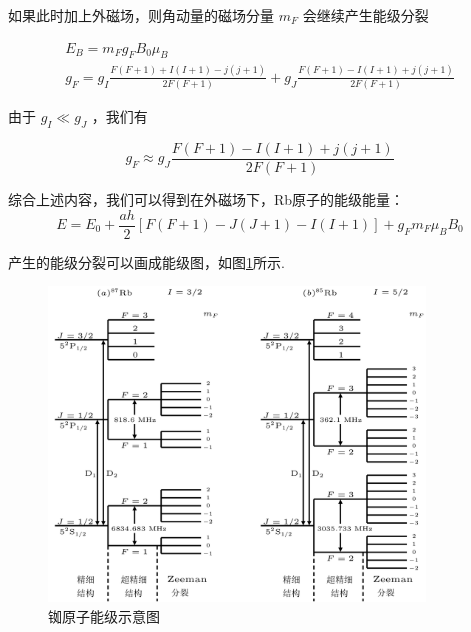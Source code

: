 \documentclass[10pt,hyperref,a4paper,UTF8]{ctexart}
\begin{document}
                如果此时加上外磁场，则角动量的磁场分量 $m_{F}$ 会继续产生能级分裂
                
                \begin{equation} 
                \begin{gathered}
                E_{B}=m_{F} g_{F} B_{0} \mu_{B} \\
                g_{F}=g_{I} \frac{F(F+1)+I(I+1)-j(j+1)}{2 F(F+1)}+g_{J} \frac{F(F+1)-I(I+1)+j(j+1)}{2 F(F+1)}
                \end{gathered}
                \end{equation}
                
                由于 $g_{I} \ll g_{J}$ ，我们有
                
                \begin{equation} 
                g_{F} \approx g_{J} \frac{F(F+1)-I(I+1)+j(j+1)}{2 F(F+1)}
                \end{equation}

                综合上述内容，我们可以得到在外磁场下，Rb原子的能级能量：
                \begin{equation}\label{eq:能级能量}
                        E=E_{0}+\frac{ah}{2}\left[F(F+1)-J(J+1)-I(I+1)\right]+g_{F}m_{F}\mu_{B}B_{0}
                \end{equation}

                产生的能级分裂可以画成能级图，如图\ref{fig:能级图}所示.
                \begin{figure}[htbp]\label{fig:能级图}
                        \centering
                        \includegraphics[width=10cm]{figures/Rbnjt.jpg}
                        \caption{铷原子能级示意图\cite{experimentBookref}}
                \end{figure}
\end{document}
